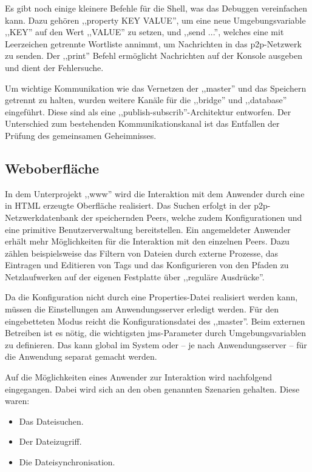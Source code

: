 \documentclass[oneside, ngerman, toc=bibliography,bibliography=totoc,listof=entryprefix, open=right,numbers=noenddot,fontsize=12pt]{scrbook}
\begin{document}
Es gibt noch einige kleinere Befehle für die Shell, was das Debuggen vereinfachen kann. Dazu gehören ,,property KEY VALUE'', um eine neue Umgebungsvariable ,,KEY'' auf den Wert ,,VALUE'' zu setzen, und ,,send ...'', welches eine mit Leerzeichen getrennte Wortliste annimmt, um Nachrichten in das \acrshort{p2p}-Netzwerk zu senden. Der ,,print'' Befehl ermöglicht Nachrichten auf der Konsole ausgeben und dient der Fehlersuche.

Um wichtige Kommunikation wie das Vernetzen der ,,master'' und das Speichern getrennt zu halten, wurden weitere Kanäle  für die ,,bridge'' und ,,database'' eingeführt. Diese sind als eine ,,publish-subscrib''-Architektur entworfen. Der Unterschied zum bestehenden Kommunikationskanal ist das Entfallen der Prüfung des gemeinsamen Geheimnisses.



\subsection{Weboberfläche}
In dem Unterprojekt ,,www'' wird die Interaktion mit dem Anwender durch eine in HTML erzeugte Oberfläche realisiert.
Das Suchen erfolgt in der \acrshort{p2p}-Netzwerkdatenbank der speichernden Peers, welche zudem Konfigurationen und eine primitive Benutzerverwaltung bereitstellen.
Ein angemeldeter Anwender erhält mehr Möglichkeiten für die Interaktion mit den einzelnen Peers. Dazu zählen beispielsweise das Filtern von Dateien durch externe Prozesse, das Eintragen und Editieren von Tags und das Konfigurieren von den Pfaden zu Netzlaufwerken auf der eigenen Festplatte über ,,reguläre Ausdrücke''.

Da die Konfiguration nicht durch eine Properties-Datei realisiert werden kann, müssen die Einstellungen am Anwendungsserver erledigt werden. Für den eingebetteten Modus reicht die Konfigurationsdatei des ,,master''. Beim externen Betreiben ist es nötig, die wichtigsten \acrshort{jms}-Parameter durch Umgebungsvariablen zu definieren. Das kann global im System oder -- je nach Anwendungsserver -- für die Anwendung separat gemacht werden.

Auf die Möglichkeiten eines Anwender zur Interaktion wird nachfolgend eingegangen.
Dabei wird sich an den oben genannten Szenarien gehalten. Diese waren:

\begin{itemize}
    \item Das Dateisuchen.
    \item Der Dateizugriff.
    \item Die Dateisynchronisation.
\end{itemize}
\end{document}
